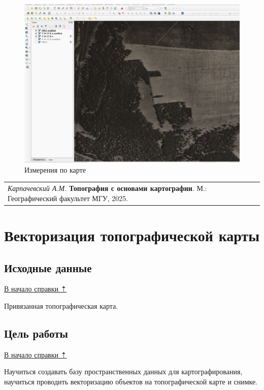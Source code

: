 \documentclass[
  12pt,
]{book}
\begin{document}
\begin{figure}
\centering
\includegraphics{images/Georeference/Measuring.gif}
\caption{Измерения по карте}
\end{figure}

\begin{longtable}[]{@{}l@{}}
\toprule\noalign{}
\endhead
\bottomrule\noalign{}
\endlastfoot
\emph{Карпачевский А.М.} \textbf{Топография с основами картографии}. М.: Географический факультет МГУ, 2025. \\
\end{longtable}

\chapter{Векторизация топографической карты}\label{digitize}

\section{Исходные данные}\label{digitize-initial}

\hyperref[digitize]{В начало справки ⇡}

Привязанная топографическая карта.

\section{Цель работы}\label{digitize-task}

\hyperref[digitize]{В начало справки ⇡}

Научиться создавать базу пространственных данных для картографирования, научиться проводить векторизацию объектов на топографической карте и снимке.
\end{document}
